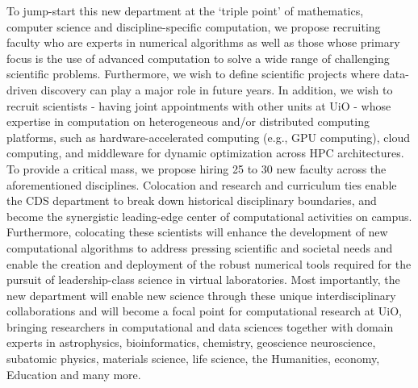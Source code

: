 \documentclass[%
oneside,                 %
final,                   %
10pt]{article}
\begin{document}
To jump-start this new department at the ‘triple point’ of mathematics, computer science and
discipline-specific computation, we propose recruiting faculty who are experts in numerical
algorithms as well as those whose primary focus is the use of advanced computation to solve a
wide range of challenging scientific problems. 
Furthermore, we wish to define scientific projects where data-driven discovery can play a major role in future years.
In addition, we wish to recruit scientists - having
joint appointments with other units at UiO - whose expertise in computation on heterogeneous
and/or distributed computing platforms, such as hardware-accelerated computing (e.g., GPU
computing), cloud computing, and middleware for dynamic optimization across HPC
architectures. To provide a critical mass, we propose hiring 25 to 30 new faculty across the
aforementioned disciplines. Colocation and research and curriculum ties enable the CDS department  to
break down historical disciplinary boundaries, and become the synergistic leading-edge center
of computational activities on campus. Furthermore, colocating these scientists will enhance
the development of new computational algorithms to address pressing scientific and societal needs and
enable the creation and deployment of the robust numerical tools required for the pursuit of
leadership-class science in virtual laboratories.
Most importantly, the new department will enable new science through these unique interdisciplinary collaborations and will
become a focal point for computational research at UiO, bringing researchers in
computational and data sciences together with domain experts in astrophysics, bioinformatics, chemistry, geoscience
neuroscience, subatomic physics, materials science, life science, the Humanities, economy, Education  and many more.
\end{document}
